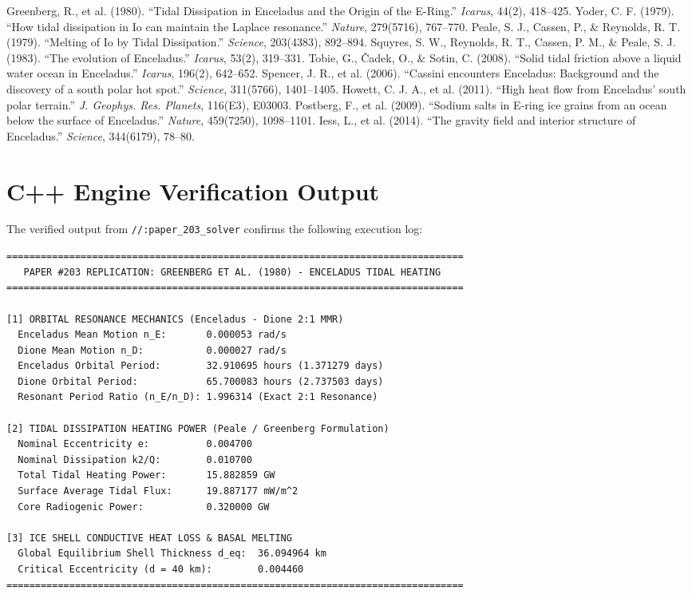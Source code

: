 \documentclass[11pt,a4paper]{article}
\begin{document}
\begin{thebibliography}{99}
 Greenberg, R., et al. (1980). ``Tidal Dissipation in Enceladus and the Origin of the E-Ring.'' \textit{Icarus}, 44(2), 418--425.
 Yoder, C. F. (1979). ``How tidal dissipation in Io can maintain the Laplace resonance.'' \textit{Nature}, 279(5716), 767--770.
 Peale, S. J., Cassen, P., \& Reynolds, R. T. (1979). ``Melting of Io by Tidal Dissipation.'' \textit{Science}, 203(4383), 892--894.
 Squyres, S. W., Reynolds, R. T., Cassen, P. M., \& Peale, S. J. (1983). ``The evolution of Enceladus.'' \textit{Icarus}, 53(2), 319--331.
 Tobie, G., Čadek, O., \& Sotin, C. (2008). ``Solid tidal friction above a liquid water ocean in Enceladus.'' \textit{Icarus}, 196(2), 642--652.
 Spencer, J. R., et al. (2006). ``Cassini encounters Enceladus: Background and the discovery of a south polar hot spot.'' \textit{Science}, 311(5766), 1401--1405.
 Howett, C. J. A., et al. (2011). ``High heat flow from Enceladus' south polar terrain.'' \textit{J. Geophys. Res. Planets}, 116(E3), E03003.
 Postberg, F., et al. (2009). ``Sodium salts in E-ring ice grains from an ocean below the surface of Enceladus.'' \textit{Nature}, 459(7250), 1098--1101.
 Iess, L., et al. (2014). ``The gravity field and interior structure of Enceladus.'' \textit{Science}, 344(6179), 78--80.
\end{thebibliography}

\appendix
\section{C++ Engine Verification Output}
The verified output from \texttt{//:paper\_203\_solver} confirms the following execution log:
\begin{verbatim}
================================================================================
   PAPER #203 REPLICATION: GREENBERG ET AL. (1980) - ENCELADUS TIDAL HEATING   
================================================================================

[1] ORBITAL RESONANCE MECHANICS (Enceladus - Dione 2:1 MMR)
  Enceladus Mean Motion n_E:       0.000053 rad/s
  Dione Mean Motion n_D:           0.000027 rad/s
  Enceladus Orbital Period:        32.910695 hours (1.371279 days)
  Dione Orbital Period:            65.700083 hours (2.737503 days)
  Resonant Period Ratio (n_E/n_D): 1.996314 (Exact 2:1 Resonance)

[2] TIDAL DISSIPATION HEATING POWER (Peale / Greenberg Formulation)
  Nominal Eccentricity e:          0.004700
  Nominal Dissipation k2/Q:        0.010700
  Total Tidal Heating Power:       15.882859 GW
  Surface Average Tidal Flux:      19.887177 mW/m^2
  Core Radiogenic Power:           0.320000 GW

[3] ICE SHELL CONDUCTIVE HEAT LOSS & BASAL MELTING
  Global Equilibrium Shell Thickness d_eq:  36.094964 km
  Critical Eccentricity (d = 40 km):        0.004460
================================================================================
\end{verbatim}
\end{document}
